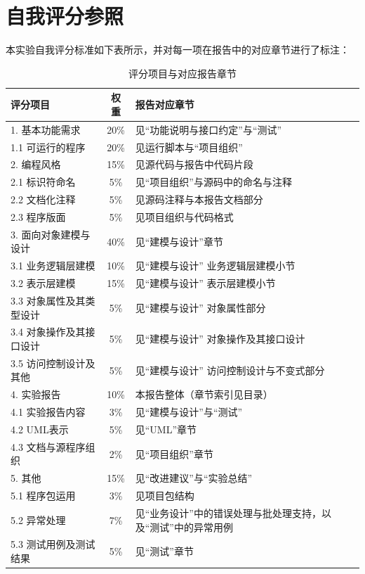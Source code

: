 \chapter{自我评分参照}

本实验自我评分标准如下表所示，并对每一项在报告中的对应章节进行了标注：


\begin{table}[htbp]
	\centering
	\begin{tabular}{|p{5cm}|c|p{9cm}|}
	\hline
  评分项目 & 权重 & 报告对应章节 \\
  \hline 
  1. 基本功能需求 & 20\% & 见“功能说明与接口约定”与“测试” \\
  1.1 可运行的程序 & 20\% & 见运行脚本与“项目组织” \\
  2. 编程风格  & 15\% & 见源代码与报告中代码片段 \\
  2.1 标识符命名 & 5\% & 见“项目组织”与源码中的命名与注释 \\
  2.2 文档化注释 & 5\% & 见源码注释与本报告文档部分 \\
  2.3 程序版面 & 5\% & 见项目组织与代码格式 \\
  3. 面向对象建模与设计 & 40\% & 见“建模与设计”章节 \\
  3.1 业务逻辑层建模 & 10\% & 见“建模与设计” 业务逻辑层建模小节 \\
  3.2 表示层建模 & 15\% & 见“建模与设计” 表示层建模小节 \\
  3.3 对象属性及其类型设计 & 5\% & 见“建模与设计” 对象属性部分 \\
  3.4 对象操作及其接口设计 & 5\% & 见“建模与设计” 对象操作及其接口设计 \\
  3.5 访问控制设计及其他 & 5\% & 见“建模与设计” 访问控制设计与不变式部分 \\
  4. 实验报告 & 10\% & 本报告整体（章节索引见目录） \\
  4.1 实验报告内容 & 3\% & 见“建模与设计”与“测试” \\
  4.2 UML表示 & 5\% & 见“UML”章节 \\
  4.3 文档与源程序组织 & 2\% & 见“项目组织”章节 \\
  5. 其他 & 15\% & 见“改进建议”与“实验总结” \\
  5.1 程序包运用 & 3\% & 见项目包结构 \\
  5.2 异常处理 & 7\% & 见“业务设计”中的错误处理与批处理支持，以及“测试”中的异常用例 \\
  5.3 测试用例及测试结果 & 5\% & 见“测试”章节 \\
  \hline
\end{tabular}
\caption{评分项目与对应报告章节}
\label{tab:self-eval-map}
\end{table}


